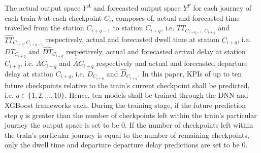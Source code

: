 \documentclass[]{interact}
\theoremstyle{plain}%
\theoremstyle{definition}
\theoremstyle{remark}
\begin{document}
The actual output space $Y^A$ and forecasted output space $Y^F$ for each journey of each train $k$ at each checkpoint $C_i$, composes of, actual and forecasted time travelled from the station $C_{i+q-1}$ to station $C_{i+q}$, i.e. $TT_{C_{i+q-1},C_{i+q}}$ and $\hat{TT}_{C_{i+q},C_{i+q-1}}$ respectively, actual and forecasted dwell time at station $C_{i+q}$, i.e. $DT_{C_{i+q}}$ and $\hat{DT}_{C_{i+q}}$ respectively, actual and forecasted arrival delay at station $C_{i+q}$, i.e. $A{C_{i+q}}$ and $\hat{A}{C_{i+q}}$ respectively and actual and forecasted departure delay at station $C_{i+q}$, i.e. $D_{C_{i+q}}$ and $\hat{D}_{C_{i+q}}$. In this paper, KPIs of up to ten future checkpoints relative to the train’s current checkpoint shall be predicted, i.e. $q \in \{1,2,...,10\}$. Hence, ten models shall be trained through the DNN and XGBoost frameworks each. During the training stage, if the future prediction step $q$ is greater than the number of checkpoints left within the train’s particular journey the output space is set to be 0. If the number of checkpoints left within the train’s particular journey is equal to the number of remaining checkpoints, only the dwell time and departure departure delay predictions are set to be 0.
\end{document}
